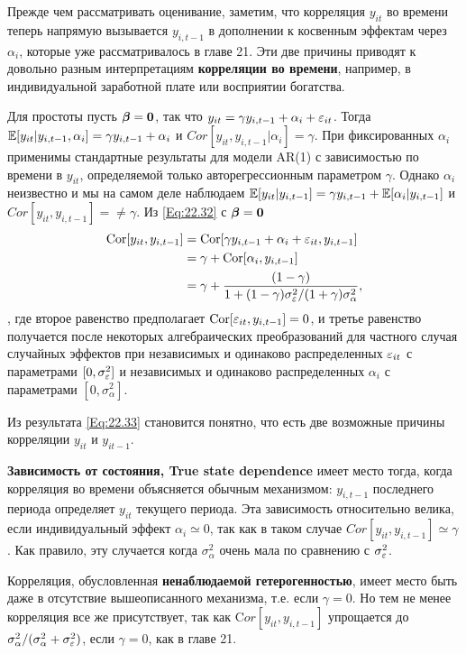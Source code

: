 Прежде чем рассматривать оценивание, заметим, что корреляция $y_{it}$ во времени теперь напрямую вызывается $y_{i,t-1}$ в дополнении к косвенным эффектам через $\alpha_i$, которые уже рассматривалось в главе 21. Эти две причины приводят к довольно  разным интерпретациям \textbf{корреляции во времени}, например, в индивидуальной заработной плате или восприятии богатства.

Для простоты пусть $\bm{\beta}=\mathbf 0$, так что $y_{it}=\gamma y_{i,t-1}+\alpha_i+\varepsilon_{it}$. Тогда $\mathbb{E}[y_{it}|y_{i,t-1}, \alpha_i]=\gamma y_{i,t-1} + \alpha_i$  и $Cor[y_{it}, y_{i,t-1}|\alpha_i]=\gamma$. При фиксированных $\alpha_i$ применимы стандартные результаты для модели AR(1) с зависимостью по времени в $y_{it}$, определяемой только авторегрессионным параметром $\gamma$. Однако $\alpha_i$  неизвестно и мы на самом деле наблюдаем $\mathbb{E}[y_{it}|y_{i,t-1}]=\gamma y_{i,t-1} + \mathbb{E}[\alpha_i|y_{i,t-1}]$  и $Cor[y_{it},y_{i,t-1}]= \neq \gamma$. Из \ref{Eq:22.32} с $\bm{\beta}=\mathbf 0$
\begin{align}
\mathrm{Cor}[y_{it}, y_{i,t-1}]
&=\mathrm{Cor}[\gamma y_{i,t-1}+\alpha_i+\varepsilon_{it},y_{i,t-1}] \nonumber \\
&=\gamma+ \mathrm{Cor}[\alpha_i,y_{i,t-1}] \nonumber \\
&=\gamma+ \frac{(1-\gamma)}{1+(1-\gamma)\sigma^2_{\varepsilon}/(1+\gamma)\sigma^2_{\alpha}}, \nonumber \\
\label{Eq:22.33}
\end{align},
где второе равенство предполагает $\mathrm{Cor}[\varepsilon_{it},y_{i,t-1}]=\mathrm 0$, и третье равенство получается после некоторых алгебраических преобразований для частного  случая случайных эффектов при независимых и одинаково распределенных $\varepsilon_{it}$ с параметрами $[0, \sigma^2_\varepsilon]$ и независимых и одинаково распределенных $\alpha_i$ с параметрами $[0, \sigma^2_{\alpha}]$.

Из результата \ref{Eq:22.33} становится понятно, что есть две возможные причины корреляции $y_{it}$ и $y_{it-1}$.

\textbf{Зависимость от состояния, True state dependence} имеет место тогда, когда корреляция во времени объясняется обычным механизмом: $y_{i,t-1}$ последнего периода определяет $y_{it}$ текущего периода. Эта зависимость относительно велика, если индивидуальный эффект $\alpha_i \simeq 0$, так как в таком случае $Cor[y_{it}, y_{i,t-1}] \simeq \gamma$. Как правило, эту случается когда $\sigma^2_{\alpha}$ очень мала по сравнению с $\sigma^2_{\varepsilon}$. 

Корреляция, обусловленная \textbf{ненаблюдаемой гетерогенностью}, имеет место быть даже в отсутствие вышеописанного механизма, т.е. если  $\gamma=0$. Но тем не менее корреляция все же присутствует, так как $\mathrm Cor[y_{it},y_{i,t-1}]$ упрощается до $\sigma^2_{\alpha}/(\sigma^2_{\alpha}+\sigma^2_{\varepsilon})$,  если $\gamma=0$, как в главе 21.

